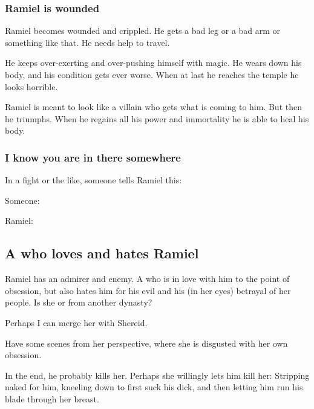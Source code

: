 \subsubsection{Ramiel is wounded}
Ramiel becomes wounded and crippled. 
He gets a bad leg or a bad arm or something like that.
He needs help to travel.

He keeps over-exerting and over-pushing himself with magic.
He wears down his body, and his condition gets ever worse.
When at last he reaches the temple he looks horrible.

Ramiel is meant to look like a villain who gets what is coming to him. 
But then he triumphs.
When he regains all his \resphan power and immortality he is able to heal his body.





\subsubsection{I know you are in there somewhere}
In a fight or the like, someone tells Ramiel this: 

\begin{prose}
  Someone: 
  
  Ramiel: 
\end{prose}







\subsection{A \resvil{} who loves and hates Ramiel}
Ramiel has an admirer and enemy. A \resvil{} who is in love with him to the point of obsession, but also hates him for his evil and his (in her eyes) betrayal of her people. Is she \Mystraacht{} or from another dynasty?

Perhaps I can merge her with Shereid. 

Have some scenes from her perspective, where she is disgusted with her own obsession. 

In the end, he probably kills her. Perhaps she willingly lets him kill her: Stripping naked for him, kneeling down to first suck his dick, and then letting him run his blade through her breast. 

